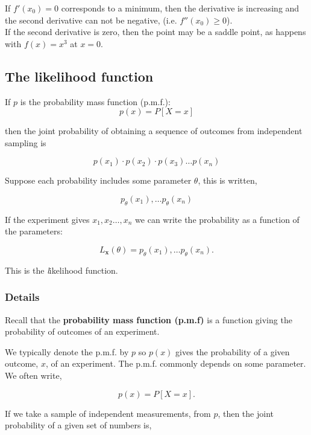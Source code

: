 \documentclass[12pt,a4paper]{article}
\theoremstyle{regla}
\theoremstyle{remark}
\theoremstyle{definition}
\theoremstyle{nonumberbreak}
\begin{document}
If $f'(x_0)=0$ corresponds to a minimum, then the derivative is increasing and the second derivative can not be negative, (i.e. $f''(x_0) \geq 0$).\\

If the second derivative is zero, then the point may be a saddle point, as happens with $f(x)=x^3$ at $x=0$.



\subsection{The likelihood function}
\begin{fbox}
\begin{minipage}{0.97\textwidth}
If $p$ is the probability mass function (p.m.f.):
$$ p(x) = P [X = x] $$

then the joint probability of obtaining a sequence of outcomes from independent sampling is

$$ p(x_1) \cdot p(x_2) \cdot p(x_3) \ldots p(x_n)$$

Suppose each probability includes some parameter $\theta$, this is written,

$$ {p_{\theta}}(x_1),  \ldots {p_{\theta}}(x_n)$$

 

If the experiment gives $ x_1, x_2 \ldots, x_n$ we can write the probability as a function of the parameters:

$$ L_{\mathbf{x}}(\theta) = p_{\theta}(x_1),  \ldots p_{\theta}(x_n).$$

This is the {\emph likelihood function}.

\end{minipage}
\end{fbox}
\subsubsection{Details}
\begin{defn}
Recall that the {\bf probability mass function (p.m.f)} is a function giving the probability of outcomes of an experiment.
\end{defn}
We typically denote the p.m.f. by $p$ so $p(x)$ gives the probability of a given outcome, $x$, of an experiment. The p.m.f.  commonly depends on some parameter. We often write,

$$ p(x) = P [X = x].$$

If we take a sample of independent measurements, from $p$, then the joint probability of a given set of numbers is, 
\end{document}
